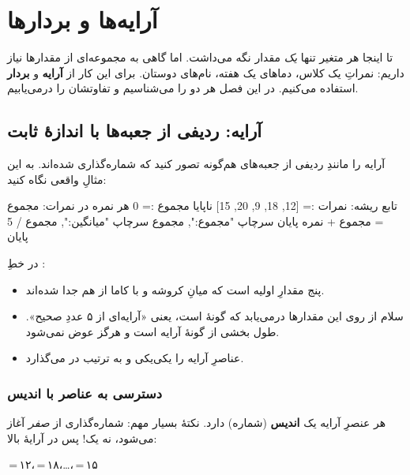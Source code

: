 \chapter{آرایه‌ها و بردارها}%
\label{ch:arrays}

تا اینجا هر متغیر تنها \emph{یک} مقدار نگه می‌داشت. اما گاهی به مجموعه‌ای از
مقدارها نیاز داریم: نمراتِ یک کلاس، دماهای یک هفته، نام‌های دوستان. برای این
کار از \textbf{آرایه} و \textbf{بردار} استفاده می‌کنیم. در این فصل هر دو را
می‌شناسیم و تفاوتشان را درمی‌یابیم.

\section{آرایه: ردیفی از جعبه‌ها با اندازهٔ ثابت}

آرایه را مانندِ ردیفی از جعبه‌های هم‌گونه تصور کنید که شماره‌گذاری شده‌اند. به
این مثالِ واقعی نگاه کنید:

\begin{salamfa}
تابع ریشه:
    نمرات := [12, 18, 9, 20, 15]
    ناپایا مجموع := 0
    هر نمره در نمرات:
        مجموع = مجموع + نمره
    پایان
    سرچاپ "مجموع:", مجموع
    سرچاپ "میانگین:", مجموع / 5
پایان
\end{salamfa}

در خطِ :
\begin{itemize}
  \item \code{[12, 18, 9, 20, 15]} پنج مقدارِ اولیه است که میانِ کروشه و با
        کاما از هم جدا شده‌اند.
  \item سلام از روی این مقدارها درمی‌یابد که گونهٔ 
         است، یعنی «آرایه‌ای از ۵ عددِ صحیح». طول بخشی از
        گونهٔ آرایه است و هرگز عوض نمی‌شود.
  \item {} عناصرِ آرایه را یکی‌یکی و به ترتیب در
         می‌گذارد.
\end{itemize}

\subsection{دسترسی به عناصر با اندیس}

هر عنصرِ آرایه یک \textbf{اندیس} (شماره) دارد. نکتهٔ بسیار مهم: شماره‌گذاری از
\emph{صفر} آغاز می‌شود، نه یک! پس در آرایهٔ بالا:

\begin{center}
\,=\,۱۲،\quad {}\,=\,۱۸،\quad \ldots،\quad {}\,=\,۱۵
\end{center}

